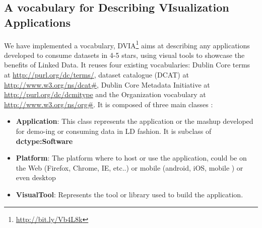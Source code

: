  \subsection{A vocabulary for Describing VIsualization Applications} \label{sec:dvia}

We have implemented a vocabulary, DVIA\footnote{\url{http://bit.ly/Vb4L8k}} aims at describing any applications developed to consume datasets in 4-5 stars, using visual tools to showcase the benefits of Linked Data. It reuses four existing vocabularies: Dublin Core terms at \url{http://purl.org/dc/terms/}, dataset catalogue (DCAT) at \url{http://www.w3.org/ns/dcat#}, Dublin Core Metadata Initiative at \url{http://purl.org/dc/dcmitype} and the Organization vocabulary at \url{http://www.w3.org/ns/org#}.  It is composed of three main classes : 

\begin{itemize}
\item \textbf{Application}: This class represents the application or the mashup developed for demo-ing or consuming data in LD fashion. It is subclass of \textbf{dctype:Software}
\item \textbf{Platform}: The platform where to host or use the application, could be on the Web (Firefox, Chrome, IE, etc..) or mobile (android, iOS, mobile ) or even desktop
\item \textbf{VisualTool}: Represents the tool or library used to build the application. 
\end{itemize}

\begin{figure}[!htbp]
\vspace{-2.5cm}
\end{figure}

